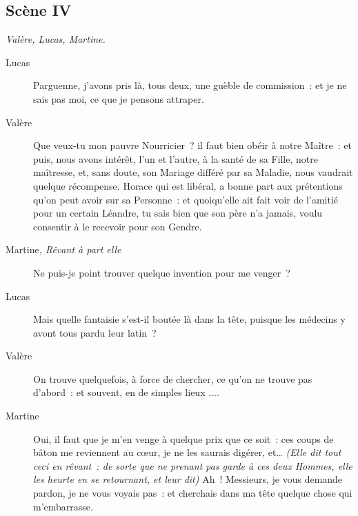 \documentclass[french,twoside]{book} %
\begin{document}
\subsection[{Scène IV}]{Scène IV}
\label{I04}
\textit{Valère, Lucas, Martine.}\par
\noindent \par
 \begin{description} \item[Lucas] 

Parguenne, j’avons pris là, tous deux, une guèble de commission : et je ne sais pas moi, ce que je pensons attraper.\end{description}
 \begin{description} \item[Valère] 

Que veux-tu mon pauvre Nourricier ? il faut bien obéir à notre Maître : et puis, nous avons intérêt, l’un et l’autre, à la santé de sa Fille, notre maîtresse, et, sans doute, son Mariage différé par sa Maladie, nous vaudrait quelque récompense. Horace qui est libéral, a bonne part aux prétentions qu’on peut avoir sur sa Personne : et quoiqu’elle ait fait voir de l’amitié pour un certain Léandre, tu sais bien que son père n’a jamais, voulu consentir à le recevoir pour son Gendre.\end{description}
 \begin{description} \item[Martine\textit{, Rêvant à part elle}\par
] 

Ne puis-je point trouver quelque invention pour me venger ?\end{description}
 \begin{description} \item[Lucas] 

Mais quelle fantaisie s’est-il boutée là dans la tête, puisque les médecins y avont tous pardu leur latin ?\end{description}
 \begin{description} \item[Valère] 

On trouve quelquefois, à force de chercher, ce qu’on ne trouve pas d’abord : et souvent, en de simples lieux ....\end{description}
 \begin{description} \item[Martine] 

Oui, il faut que je m’en venge à quelque prix que ce soit : ces coups de bâton me reviennent au cœur, je ne les saurais digérer, et… \textit{(Elle dit tout ceci en rêvant : de sorte que ne prenant pas garde à ces deux Hommes, elle les heurte en se retournant, et leur dit)} Ah ! Messieurs, je vous demande pardon, je ne vous voyais pas : et cherchais dans ma tête quelque chose qui m’embarrasse.\end{description}
\end{document}
